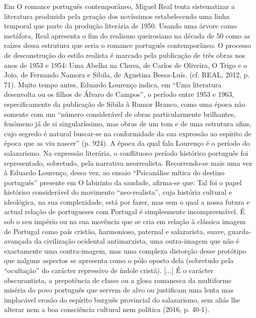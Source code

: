 \documentclass[../DISSERTACAO_MAIN.tex]{subfiles}
\begin{document}
Em O romance português contemporâneo, Miguel Real tenta sistematizar a literatura produzida pela geração dos novíssimos estabelecendo uma linha temporal que parte da produção literária de 1950. Usando uma árvore como metáfora, Real apresenta o fim do realismo queirosiano na década de 50 como as raízes dessa estrutura que seria o romance português contemporâneo. O processo de desconstrução do estilo realista é marcado pela publicação de três obras nos anos de 1953 e 1954: Uma Abelha na Chuva, de Carlos de Oliveira, O Trigo e o Joio, de Fernando Namora e Sibila, de Agustina Bessa-Luís. (cf. REAL, 2012, p. 71). Muito tempo antes, Eduardo Lourenço indica, em “Uma literatura desenvolta ou os filhos de Álvaro de Campos”, o período entre 1953 e 1963, especificamente da publicação de Sibila à Rumor Branco, como uma época não somente com um “número considerável de obras particularmente brilhantes, fenómeno já de si singularíssimo, mas obras de um tom e de uma estrutura afins, cujo segredo é natural buscar-se na conformidade da sua expressão ao espírito de época que as viu nascer” (p. 924).
A época da qual fala Lourenço é o período do salazarismo. Na expressão literária, o conflituoso período histórico português foi representado, sobretudo, pela narrativa neorrealista. Recorrendo-se mais uma vez à Eduardo Lourenço, dessa vez, ao ensaio “Psicanálise mítica do destino português” presente em O labirinto da saudade, afirma-se que:
Tal foi o papel histórico considerável do movimento “neo-realista”, cuja história cultural e ideológica, na sua complexidade, está por fazer, mas sem o qual a nossa futura e actual relação de portugueses com Portugal é simplesmente incompreensível. É sob o seu império ou na sua movência que se cria em relação à clássica imagem de Portugal como país cristão, harmonioso, paternal e salazarista, suave, guarda-avançada da civilização ocidental antimarxista, uma outra-imagem que não é exactamente uma contra-imagem, mas uma complexa distorção desse protótipo que nalguns aspectos se apresenta como o pólo oposto dela (sobretudo pela “ocultação” do carácter repressivo de índole cristã). [...] É o carácter obscurantista, a prepotência de classe ou a glosa romanesca da multiforme miséria do povo português que servem de alvo ou justificam uma lenta mas implacável erosão do espírito burguês provincial do salazarismo, sem aliás lhe alterar nem a boa consciência cultural nem política (2016, p. 40-1). 
\end{document}
